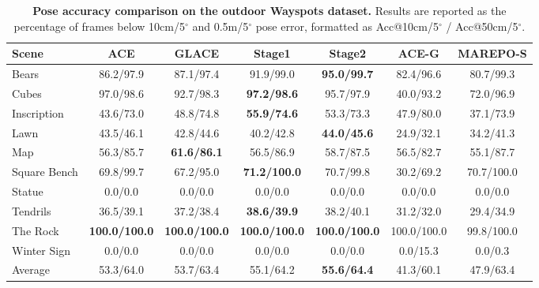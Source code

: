 \begin{table}[t]
\centering
\small
\setlength{\tabcolsep}{5.0pt}
\renewcommand{\arraystretch}{1.08}
\caption{\textbf{Pose accuracy comparison on the outdoor Wayspots dataset.}
Results are reported as the percentage of frames below 10cm/5$^\circ$ and 0.5m/5$^\circ$ pose error, formatted as Acc@10cm/5$^\circ$ / Acc@50cm/5$^\circ$.}
\label{tab:wayspots_acc10_acc50}
\begin{tabular*}{\textwidth}{@{\extracolsep{\fill}}lcccccc@{}}
\toprule
Scene
& ACE
& GLACE
& Stage1
& Stage2
& ACE-G
& MAREPO-S \\
\midrule
Bears
& 86.2/97.9
& 87.1/97.4
& 91.9/99.0
& \textbf{95.0/99.7}
& 82.4/96.6
& 80.7/99.3 \\
Cubes
& 97.0/98.6
& 92.7/98.3
& \textbf{97.2/98.6}
& 95.7/97.9
& 40.0/93.2
& 72.0/96.9 \\
Inscription
& 43.6/73.0
& 48.8/74.8
& \textbf{55.9/74.6}
& 53.3/73.3
& 47.9/80.0
& 37.1/73.9 \\
Lawn
& 43.5/46.1
& 42.8/44.6
& 40.2/42.8
& \textbf{44.0/45.6}
& 24.9/32.1
& 34.2/41.3 \\
Map
& 56.3/85.7
& \textbf{61.6/86.1}
& 56.5/86.9
& 58.7/87.5
& 56.5/82.7
& 55.1/87.7 \\
Square Bench
& 69.8/99.7
& 67.2/95.0
& \textbf{71.2/100.0}
& 70.7/99.8
& 30.2/69.2
& 70.7/100.0 \\
Statue
& 0.0/0.0
& 0.0/0.0
& 0.0/0.0
& 0.0/0.0
& 0.0/0.0
& 0.0/0.0 \\
Tendrils
& 36.5/39.1
& 37.2/38.4
& \textbf{38.6/39.9}
& 38.2/40.1
& 31.2/32.0
& 29.4/34.9 \\
The Rock
& \textbf{100.0/100.0}
& \textbf{100.0/100.0}
& \textbf{100.0/100.0}
& \textbf{100.0/100.0}
& 100.0/100.0
& 99.8/100.0 \\
Winter Sign
& 0.0/0.0
& 0.0/0.0
& 0.0/0.0
& 0.0/0.0
& 0.0/15.3
& 0.0/0.3 \\
\midrule
Average
& 53.3/64.0
& 53.7/63.4
& 55.1/64.2
& \textbf{55.6/64.4}
& 41.3/60.1
& 47.9/63.4 \\
\bottomrule
\end{tabular*}
\end{table}
